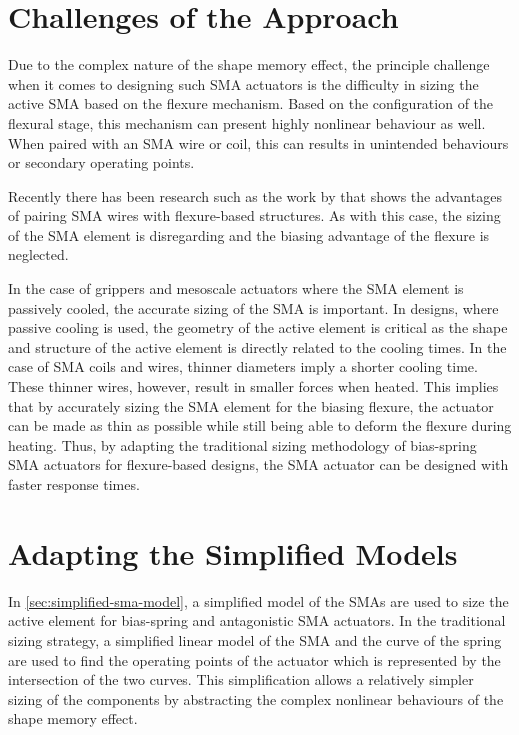 \section{Challenges of the Approach}
Due to the complex nature of the shape memory effect, the principle challenge when it comes to designing such SMA actuators is the difficulty in sizing the active SMA based on the flexure mechanism. Based on the configuration of the flexural stage, this mechanism can present highly nonlinear behaviour as well. When paired with an SMA wire or coil, this can results in unintended behaviours or secondary operating points.

Recently there has been research such as the work by \cite{maffiodo_three-fingered_2017} that shows the advantages of pairing SMA wires with flexure-based structures. As with this case, the sizing of the SMA element is disregarding and the biasing advantage of the flexure is neglected.

In the case of grippers and mesoscale actuators where the SMA element is passively cooled, the accurate sizing of the SMA is important. In designs, where passive cooling is used, the geometry of the active element is critical as the shape and structure of the active element is directly related to the cooling times. In the case of SMA coils and wires, thinner diameters imply a shorter cooling time. These thinner wires, however, result in smaller forces when heated. This implies that by accurately sizing the SMA element for the biasing flexure, the actuator can be made as thin as possible while still being able to deform the flexure during heating. Thus, by adapting the traditional sizing methodology of bias-spring SMA actuators for flexure-based designs, the SMA actuator can be designed with faster response times.

\section{Adapting the Simplified Models}
In \cref{sec:simplified-sma-model}, a simplified model of the SMAs are used to size the active element for bias-spring and antagonistic SMA actuators. In the traditional sizing strategy, a simplified linear model of the SMA and the curve of the spring are used to find the operating points of the actuator which is represented by the intersection of the two curves. This simplification allows a relatively simpler sizing of the components by abstracting the complex nonlinear behaviours of the shape memory effect.

